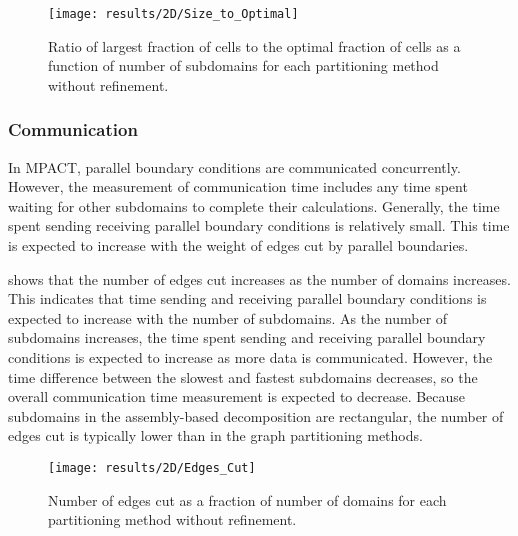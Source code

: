 {{{{        \begin{figure}
          \centering
          \texttt{[image: results/2D/Size\_to\_Optimal]}
          \caption{Ratio of largest fraction of cells to the optimal fraction of cells as a function of number of subdomains for each partitioning method without refinement.\label{fig:Spatial Decomposition:Max/Optimal Ratio}}
        \end{figure}
      }
      \subsubsection{Communication}{\label{sssec:Communication}
        In MPACT, parallel boundary conditions are communicated concurrently.
        However, the measurement of communication time includes any time spent waiting for other subdomains to complete their calculations.
        Generally, the time spent sending receiving parallel boundary conditions is relatively small.
        This time is expected to increase with the weight of edges cut by parallel boundaries.

         shows that the number of edges cut increases as the number of domains increases.
        This indicates that time sending and receiving parallel boundary conditions is expected to increase with the number of subdomains.
        As the number of subdomains increases, the time spent sending and receiving parallel boundary conditions is expected to increase as more data is communicated.
        However, the time difference between the slowest and fastest subdomains decreases, so the overall communication time measurement is expected to decrease.
        Because subdomains in the assembly-based decomposition are rectangular, the number of edges cut is typically lower than in the graph partitioning methods.

        \begin{figure}
          \centering
          \texttt{[image: results/2D/Edges\_Cut]}
          \caption{Number of edges cut as a fraction of number of domains for each partitioning method without refinement. \label{fig:Spatial Decomposition:2D Communication}}
        \end{figure}
      }
}}}
